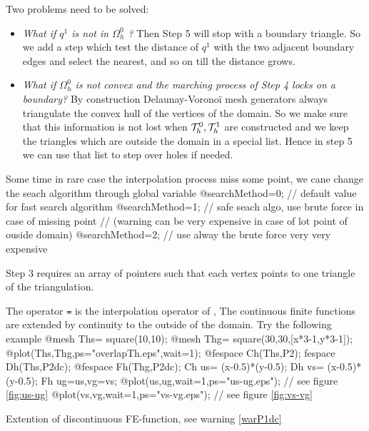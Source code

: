 \documentclass[a4paper,twoside,12pt]{book}
\begin{document}
Two problems need to be solved:
\begin{itemize}
  \item {\it  What if $q^1$ is not in $\Omega^0_h$ ?}  Then Step 5 will stop with a
 boundary triangle. So we add a step which test the distance of $q^1$ with the
 two adjacent boundary edges and select the nearest, and so on till the distance
 grows.
 \medskip
 \item {\it What if $\Omega^0_h$ is not convex and the marching process of Step 4
 locks on a boundary?}
 By construction  Delaunay-Vorono\"{i} mesh generators always triangulate the convex
 hull of the vertices of the domain.  So we make sure that this information is not
 lost when ${\cal T}_{h}^0,{\cal T}_{h}^1$ are constructed and we keep the triangles which are
 outside the domain in a special list. Hence in step 5 we can use that list
 to step over holes if needed.
\end{itemize}
\begin{note}
 Some time in rare case the interpolation process miss some point, we cane change the 
 seach algorithm through global variable  
\bFF
 @searchMethod=0; // default value for  fast search algorithm
 @searchMethod=1; //  safe seach algo,  use brute force in case of missing point 
 // (warning can be very expensive in case of lot point  of ouside domain)
 @searchMethod=2; //  use alway the  brute force very very expensive  
\eFF
\end{note}
\begin{note}
 Step 3 requires an array of pointers
 such that each vertex points to one triangle
 of the triangulation.
\end{note}

\begin{note} The operator \texttt{=} is the interpolation operator of \freefempp,  The continuous finite functions are extended by continuity to the outside of the domain.
\index{=}
Try the following example
\bFF
@mesh Ths= square(10,10);
@mesh Thg= square(30,30,[x*3-1,y*3-1]);
@plot(Ths,Thg,ps="overlapTh.eps",wait=1);
@fespace Ch(Ths,P2); fespace Dh(Ths,P2dc);
@fespace Fh(Thg,P2dc);
Ch us= (x-0.5)*(y-0.5);
Dh vs= (x-0.5)*(y-0.5);
Fh ug=us,vg=vs;
@plot(us,ug,wait=1,ps="us-ug.eps"); // see figure \ref{fig:us-ug}
@plot(vs,vg,wait=1,ps="vs-vg.eps"); // see figure \ref{fig:vs-vg}
\eFF

%
{Extention of discontinuous FE-function\label{fig:vs-vg}, see warning \ref{warP1dc} }

\end{note}
\end{document}
